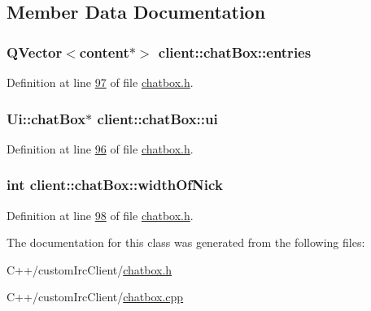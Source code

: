 \subsection{Member Data Documentation}
\hypertarget{classclient_1_1chat_box_a7dfca52166c2acf049d5498600a4d222}{
\subsubsection[{entries}]{\setlength{\rightskip}{0pt plus 5cm}Q\-Vector$<${\bf content}$\ast$$>$ client\-::chat\-Box\-::entries\hspace{0.3cm}{\ttfamily [private]}}}\label{da/d72/classclient_1_1chat_box_a7dfca52166c2acf049d5498600a4d222}


Definition at line \hyperlink{chatbox_8h_source_l00097}{97} of file \hyperlink{chatbox_8h_source}{chatbox.\-h}.

\hypertarget{classclient_1_1chat_box_a2382f94a54ab5b232f8bb1b4e124aeea}{
\subsubsection[{ui}]{\setlength{\rightskip}{0pt plus 5cm}Ui\-::chat\-Box$\ast$ client\-::chat\-Box\-::ui\hspace{0.3cm}{\ttfamily [private]}}}\label{da/d72/classclient_1_1chat_box_a2382f94a54ab5b232f8bb1b4e124aeea}


Definition at line \hyperlink{chatbox_8h_source_l00096}{96} of file \hyperlink{chatbox_8h_source}{chatbox.\-h}.

\hypertarget{classclient_1_1chat_box_a53cb33664252841a8851f4f34077ca39}{
\subsubsection[{width\-Of\-Nick}]{\setlength{\rightskip}{0pt plus 5cm}int client\-::chat\-Box\-::width\-Of\-Nick\hspace{0.3cm}{\ttfamily [private]}}}\label{da/d72/classclient_1_1chat_box_a53cb33664252841a8851f4f34077ca39}


Definition at line \hyperlink{chatbox_8h_source_l00098}{98} of file \hyperlink{chatbox_8h_source}{chatbox.\-h}.



The documentation for this class was generated from the following files\-:\begin{DoxyCompactItemize}
\item 
C++/custom\-Irc\-Client/\hyperlink{chatbox_8h}{chatbox.\-h}\item 
C++/custom\-Irc\-Client/\hyperlink{chatbox_8cpp}{chatbox.\-cpp}\end{DoxyCompactItemize}
